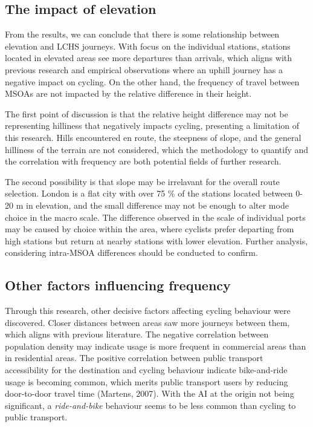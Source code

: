 \documentclass[
  12pt,
  a4paper,
  DIV=11,
  numbers=noendperiod]{scrartcl}
\begin{document}
\hypertarget{the-impact-of-elevation}{%
\subsection{The impact of elevation}\label{the-impact-of-elevation}}

From the results, we can conclude that there is some relationship
between elevation and LCHS journeys. With focus on the individual
stations, stations located in elevated areas see more departures than
arrivals, which aligns with previous research and empirical observations
where an uphill journey has a negative impact on cycling. On the other
hand, the frequency of travel between MSOAs are not impacted by the
relative difference in their height.

The first point of discussion is that the relative height difference may
not be representing hilliness that negatively impacts cycling,
presenting a limitation of this research. Hills encountered en route,
the steepness of slope, and the general hilliness of the terrain are not
considered, which the methodology to quantify and the correlation with
frequency are both potential fields of further research.

The second possibility is that slope may be irrelavant for the overall
route selection. London is a flat city with over 75 \% of the stations
located between 0-20 m in elevation, and the small difference may not be
enough to alter mode choice in the macro scale. The difference observed
in the scale of individual ports may be caused by choice within the
area, where cyclists prefer departing from high stations but return at
nearby stations with lower elevation. Further analysis, considering
intra-MSOA differences should be conducted to confirm.

\hypertarget{other-factors-influencing-frequency}{%
\subsection{Other factors influencing
frequency}\label{other-factors-influencing-frequency}}

Through this research, other decisive factors affecting cycling
behaviour were discovered. Closer distances between areas saw more
journeys between them, which aligns with previous literature. The
negative correlation between population density may indicate usage is
more frequent in commercial areas than in residential areas. The
positive correlation between public transport accessibility for the
destination and cycling behaviour indicate bike-and-ride usage is
becoming common, which merits public transport users by reducing
door-to-door travel time (Martens, 2007). With the AI at the origin not
being significant, a \emph{ride-and-bike} behaviour seems to be less
common than cycling to public transport.
\end{document}
